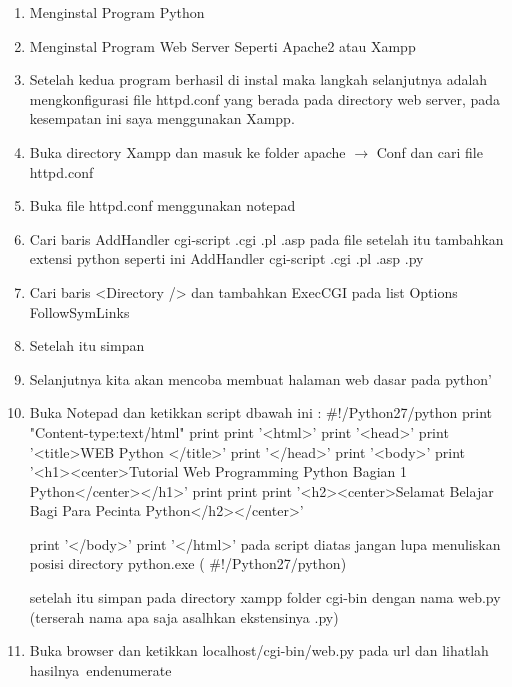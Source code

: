\begin{enumerate}
	\item Menginstal Program Python  
	\item Menginstal Program Web Server Seperti Apache2 atau Xampp  
	\item Setelah kedua program berhasil di instal maka langkah selanjutnya adalah mengkonfigurasi file httpd.conf yang berada pada directory web server, pada kesempatan ini saya menggunakan Xampp. 
	\item Buka directory Xampp dan masuk ke folder apache  $  \rightarrow  $ Conf dan cari file httpd.conf 
	\item Buka file httpd.conf menggunakan notepad 
	\item Cari baris AddHandler cgi-script .cgi .pl .asp pada file setelah itu tambahkan extensi python seperti ini AddHandler cgi-script .cgi .pl .asp .py 
	\item Cari baris <Directory /> dan tambahkan ExecCGI pada list Options FollowSymLinks  
	\item Setelah itu simpan 
	\item Selanjutnya kita akan mencoba membuat halaman web dasar pada python’ 
	\item Buka Notepad dan ketikkan script dbawah ini : 
	$  \#  $!/Python27/python 
	print "Content-type:text/html"
	print 
	print '<html>' 
	print '<head>' 
	print '<title>WEB Python </title>' 
	print '</head>' 
	print '<body>' 
	print '<h1><center>Tutorial Web Programming Python Bagian 1 Python</center></h1>' 
	print 
	print 
	print '<h2><center>Selamat Belajar Bagi Para Pecinta Python</h2></center>' 
	
	print '</body>' 
	print '</html>' 
	pada script diatas jangan lupa menuliskan posisi directory python.exe ( $  \#  $!/Python27/python) 
	
	setelah itu simpan pada directory xampp folder cgi-bin dengan nama web.py (terserah nama apa saja asalhkan ekstensinya .py) 
	
	\item Buka browser dan ketikkan localhost/cgi-bin/web.py pada url dan lihatlah hasilnya\
end{enumerate}


\end{enumerate}
